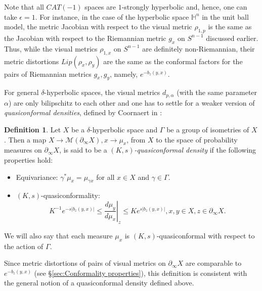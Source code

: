 \documentclass[12pt]{amsbook}%
\theoremstyle{definition}
\newtheorem{defi}[thm]{Definition}
\theoremstyle{remark}
\numberwithin{section}{chapter}
\numberwithin{subsection}{section}
\numberwithin{figure}{chapter}
\def\eps{\epsilon}
\def\bH{{\mathbb{H}}}
\def\cM{{\mathscr{M}}}
\def\Ga{\Gamma}
\def\ga{\gamma}
\def\al{\alpha}
\def\geo{\partial_\infty}
\def\kap{}
\begin{document}
{{Note that all $CAT(-1)$ spaces are $1$-strongly hyperbolic and, hence, one can take $\eps=1$. For instance, in the case of the hyperbolic space $\bH^n$ in the unit ball model, 
 the metric Jacobian with respect to the visual metric $\rho_{1,p}$ is the same as the Jacobian with respect to the Riemannian metric $g_x$ on $S^{n-1}$ discussed earlier.  
 Thus, while the visual metrics $\rho_{1,x}$ on $S^{n-1}$ are definitely non-Riemannian, their metric distortions  $Lip(\rho_x,\rho_y)$ are the same as the conformal factors for the pairs of Riemannian metrics $g_x, g_y$, namely,  $e^{-b_z(y,x)}$. 



For general $\delta$-hyperbolic spaces, the visual metrics $d_{p,\al}$ (with the same parameter $\al$) 
are only bilipschitz to each other and one has to settle for a weaker version of  
{\em quasiconformal densities}, defined by Coornaert in \cite{Coo93}:   

\begin{defi}
Let $X$ be a $\delta$-hyperbolic space and $\Ga$ be a group of isometries of $X$. Then a map $X\to \cM(\geo X), x\to \mu_x$, 
from $X$ to the space of probability measures on $\geo X$, is said to be a {\em $(K,s)$-quasiconformal density} if the following properties hold:
\begin{itemize}
\item Equivariance: $\ga^*\mu_x=\mu_{\ga x}$ for all $x\in X$ and $\ga\in \Ga$. 

\item $(K,s)$-quasiconformality:
$$
K^{-1} e^{-s |b_z(y,x)|} \le \left. \frac{d\mu_y}{d\mu_x}\right\vert_z\le K e^{s |b_z(y,x)|}, x, y\in X, z\in \geo X.
$$ 
\end{itemize}
 We will also say that each measure $\mu_x$ is $(K,s)$-quasiconformal with respect to the action of $\Ga$. 
\end{defi}

Since metric distortions of pairs of visual metrics on $\geo X$ are comparable to  $e^{-b_z(y,x)}$ (see \S \ref{sec:Conformality properties}), this definition is consistent 
with the general notion of a quasiconformal density defined above. 



}}
\end{document}
